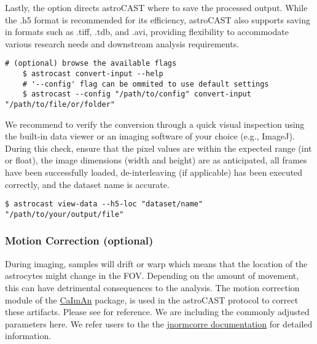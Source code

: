 Lastly, the  option directs astroCAST where to save the processed output. While the .h5 format is recommended for its efficiency, astroCAST also supports saving in formats such as .tiff, .tdb, and .avi, providing flexibility to accommodate various research needs and downstream analysis requirements.

\begin{lstlisting}[style=bashStyle]
    # (optional) browse the available flags
    $ astrocast convert-input --help
    # '--config' flag can be ommited to use default settings
    $ astrocast --config "/path/to/config" convert-input "/path/to/file/or/folder"
\end{lstlisting}

We recommend to verify the conversion through a quick visual inspection using the built-in data viewer or an imaging software of your choice (e.g., ImageJ). During this check, ensure that the pixel values are within the expected range (int or float), the image dimensions (width and height) are as anticipated, all frames have been successfully loaded, de-interleaving (if applicable) has been executed correctly, and the dataset name is accurate.

\begin{lstlisting}[style=bashStyle]
    $ astrocast view-data --h5-loc "dataset/name" "/path/to/your/output/file"
\end{lstlisting}


\subsubsection{Motion Correction (optional)}

During imaging, samples will drift or warp which means that the location of the astrocytes might change in the \ac{FOV}. Depending on the amount of movement, this can have detrimental consequences to the analysis. The motion correction module of the \href{https://github.com/flatironinstitute/CaImAn}{CaImAn} package\citep{giovannucci_caiman_2019}, is used in the astroCAST protocol to correct these artifacts. Please see  for reference. We are including the commonly adjusted parameters here. We refer users to the the \href{https://jnormcorre.readthedocs.io/en/latest/Algo.html#motion-correction-methods}{jnormcorre documentation} for detailed information.

